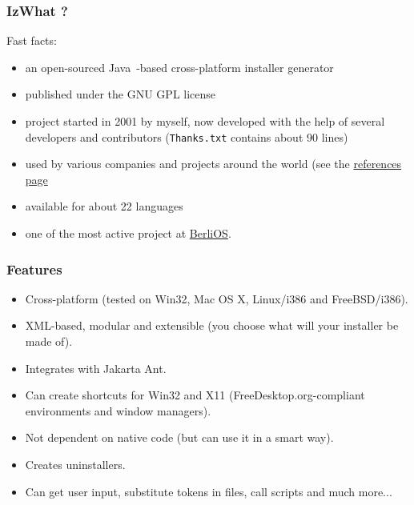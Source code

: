 \documentclass[compress,10pt]{beamer}
\begin{document}
\begin{frame}

\frametitle{IzWhat ?}

Fast facts:
  \begin{itemize}
    \item an open-sourced Java\texttrademark~-based cross-platform installer
    generator

    \item published under the GNU GPL license

    \item project started in 2001 by myself, now developed with the help of
    several developers and contributors (\texttt{Thanks.txt} contains about 90
    lines)

    \item used by various companies and projects around the world (see the
    \href{http://www.izforge.com/izpack/index.php?page=references}{references
    page}

    \item available for about 22 languages

    \item one of the most active project at
    \href{http://www.berlios.de/}{BerliOS}.
  \end{itemize}

\end{frame}


\begin{frame}

\frametitle{Features}

\begin{itemize}

  \item Cross-platform (tested on Win32, Mac OS X, Linux/i386 and FreeBSD/i386).

  \item XML-based, modular and extensible (you choose what will your installer be
  made of).

  \item Integrates with Jakarta Ant.

  \item Can create shortcuts for Win32 and X11 (FreeDesktop.org-compliant
  environments and window managers).

  \item Not dependent on native code (but can use it in a smart way).

  \item Creates uninstallers.

  \item Can get user input, substitute tokens in files, call scripts and much
  more...

\end{itemize}

\end{frame}
\end{document}
